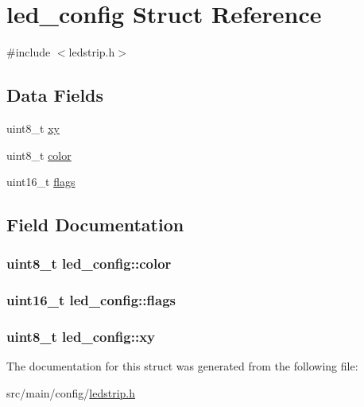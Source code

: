 \hypertarget{structled__config}{\section{led\+\_\+config Struct Reference}
\label{structled__config}
}


{\ttfamily \#include $<$ledstrip.\+h$>$}

\subsection*{Data Fields}
\begin{DoxyCompactItemize}
\item 
uint8\+\_\+t \hyperlink{structled__config_a9388926f67cdc2794855a0e01e73d4b9}{xy}
\item 
uint8\+\_\+t \hyperlink{structled__config_a03395932fd177110b822bb13b0dfc42e}{color}
\item 
uint16\+\_\+t \hyperlink{structled__config_a552f5602b3babe5d1cb63e9c5276ee8f}{flags}
\end{DoxyCompactItemize}


\subsection{Field Documentation}
\hypertarget{structled__config_a03395932fd177110b822bb13b0dfc42e}{
\subsubsection[{color}]{\setlength{\rightskip}{0pt plus 5cm}uint8\+\_\+t led\+\_\+config\+::color}}\label{structled__config_a03395932fd177110b822bb13b0dfc42e}
\hypertarget{structled__config_a552f5602b3babe5d1cb63e9c5276ee8f}{
\subsubsection[{flags}]{\setlength{\rightskip}{0pt plus 5cm}uint16\+\_\+t led\+\_\+config\+::flags}}\label{structled__config_a552f5602b3babe5d1cb63e9c5276ee8f}
\hypertarget{structled__config_a9388926f67cdc2794855a0e01e73d4b9}{
\subsubsection[{xy}]{\setlength{\rightskip}{0pt plus 5cm}uint8\+\_\+t led\+\_\+config\+::xy}}\label{structled__config_a9388926f67cdc2794855a0e01e73d4b9}


The documentation for this struct was generated from the following file\+:\begin{DoxyCompactItemize}
\item 
src/main/config/\hyperlink{config_2ledstrip_8h}{ledstrip.\+h}\end{DoxyCompactItemize}
